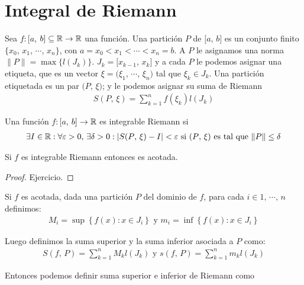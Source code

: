 \section{Integral de Riemann}

Sea $f: [a$, $b] \subseteq \mathbb{R} \to \mathbb{R}$ una función.
Una partición $P$ de $[a$, $b]$ es un conjunto finito \\ $\{ x_0$, $x_1$, $\cdots$, $x_n \}$, con
$a = x_0 < x_1 < \cdots < x_n = b$. A $P$ le asignamos una norma $\| P \| = \max \{ l(J_k) \}$. $J_k = [x_{k-1}$, $x_k]$ y a cada $P$ le
podemos asignar una etiqueta, que es un vector $\xi = (\xi_1$, $\cdots$, $\xi_n)$ tal que $\xi_k \in J_k$. Una partición etiquetada es un par
$(P$, $\xi)$; y le podemos asignar su suma de Riemann \begin{align*}S(P\text{, } \xi) = \sum_{k=1}^{n} f(\xi_k) l(J_k)\end{align*}

\begin{definition}
    Una función $f: [a$, $b] \to \mathbb{R}$ es integrable Riemann si
    \begin{align*}
        \exists I \in \mathbb{R} : \forall \varepsilon > 0\text{, }\exists \delta > 0 : | S(P\text{, } \xi) - I | < \varepsilon \text{ si } (P\text{, } \xi) \text{ es tal que } \| P \| \leq \delta
    \end{align*}
\end{definition}

\begin{prop}
    Si $f$ es integrable Riemann entonces es acotada.
    \begin{proof}
        Ejercicio.
    \end{proof}
\end{prop}

Si $f$ es acotada, dada una partición $P$ del dominio de $f$, para cada $i \in 1 \text{, } \cdots \text{, } n$ definimos:
\begin{align*}
    M_i = \sup \left\{ f(x) : x \in J_i \right\} \text{ y } m_i = \inf\left\{ f(x) : x \in J_i \right\}
\end{align*}

Luego definimos la suma superior y la suma inferior asociada a $P$ como:
\begin{align*}
    S(f\text{, } P) = \sum_{k=1}^{n} M_k l(J_k) \text{ y } s(f\text{, } P) = \sum_{k=1}^{n} m_k l(J_k)
\end{align*}

Entonces podemos definir suma superior e inferior de Riemann como


